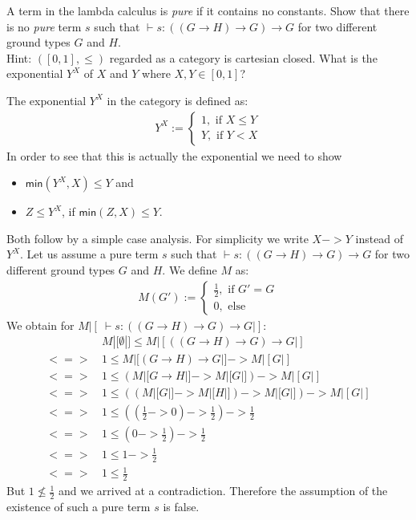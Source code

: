 \begin{exercise}
    \label{ex:pure-peirce}
    A term in the lambda calculus is \textit{pure} if it contains no constants.
    Show that there is no \textit{pure} term $s$ such that $ \vdash s: ((G \to H) \to G) \to G$ for two different ground types $G$ and $H$.\\
    Hint: $([0, 1], \le)$ regarded as a category is cartesian closed.
    What is the exponential $Y^X$ of $X$ and $Y$ where $X, Y \in [0, 1]$?
\end{exercise}
\begin{answer}
    The exponential $Y^X$ in the category is defined as:
    \begin{align*}
        Y^X := \begin{cases}
            1, \text{ if } X \le Y\\
            Y, \text{ if } Y < X
               \end{cases}
    \end{align*}
    In order to see that this is actually the exponential we need to show
    \begin{itemize}
        \item $\mathsf{min}(Y^X, X) \le Y$ and
        \item $Z \le Y^X$, if $\mathsf{min}(Z, X) \le Y$.
    \end{itemize}
    Both follow by a simple case analysis.
    For simplicity we write $X -> Y$ instead of $Y^X$.
    Let us assume a pure term $s$ such that $ \vdash s: ((G \to H) \to G) \to G$ for two different ground types $G$ and $H$.
    We define $M$ as:
    \begin{align*}
        M(G') := \begin{cases}
                \frac{1}{2}, \text{ if } G' = G\\
                0, \text{ else}
            \end{cases}
    \end{align*}
    We obtain for $M|[\ \vdash s: ((G \to H) \to G) \to G|]$:
    \begin{align*}
              & M|[\emptyset|] \le M|[((G \to H) \to G) \to G|] \\
        <=>\, & 1 \le M|[(G \to H) \to G|] -> M|[G|] \\
        <=>\, & 1 \le (M|[G \to H|] -> M|[G|]) -> M|[G|] \\
        <=>\, & 1 \le ((M|[G|] -> M|[H|]) -> M|[G|]) -> M|[G|] \\
        <=>\, & 1 \le ((\frac{1}{2} -> 0) -> \frac{1}{2}) -> \frac{1}{2} \\
        <=>\, & 1 \le (0 -> \frac{1}{2}) -> \frac{1}{2} \\
        <=>\, & 1 \le 1 -> \frac{1}{2} \\
        <=>\, & 1 \le \frac{1}{2}
    \end{align*}
    But $1 \nleq \frac{1}{2}$ and we arrived at a contradiction.
    Therefore the assumption of the existence of such a pure term $s$ is false.
\end{answer}

